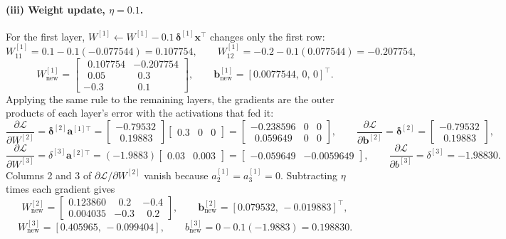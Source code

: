 \documentclass[11pt,a4paper]{article}
\begin{document}
\paragraph{(iii) Weight update, $\eta=0.1$.} For the first layer,
$W^{[1]}\leftarrow W^{[1]}-0.1\,\boldsymbol{\delta}^{[1]}\mathbf{x}^\top$ changes only the
first row:
\[
W^{[1]}_{11}=0.1-0.1(-0.077544)=0.107754,\qquad
W^{[1]}_{12}=-0.2-0.1(0.077544)=-0.207754,
\]
\[
W^{[1]}_{\text{new}}=\begin{bmatrix}
\ \ 0.107754&-0.207754\\ \ \ 0.05&\ \ 0.3\\ -0.3&\ \ 0.1\end{bmatrix},
\qquad
\mathbf{b}^{[1]}_{\text{new}}=[0.0077544,\,0,\,0]^\top .
\]
Applying the same rule to the remaining layers, the gradients are the outer products of each
layer's error with the activations that fed it:
\[
\frac{\partial\mathcal{L}}{\partial W^{[2]}}
=\boldsymbol{\delta}^{[2]}\mathbf{a}^{[1]\top}
=\begin{bmatrix}-0.79532\\ \ \ 0.19883\end{bmatrix}
 \begin{bmatrix}0.3&0&0\end{bmatrix}
=\begin{bmatrix}-0.238596&0&0\\ \ \ 0.059649&0&0\end{bmatrix},
\qquad
\frac{\partial\mathcal{L}}{\partial \mathbf{b}^{[2]}}
=\boldsymbol{\delta}^{[2]}=\begin{bmatrix}-0.79532\\ \ \ 0.19883\end{bmatrix},
\]
\[
\frac{\partial\mathcal{L}}{\partial W^{[3]}}
=\delta^{[3]}\mathbf{a}^{[2]\top}
=(-1.9883)\begin{bmatrix}0.03&0.003\end{bmatrix}
=\begin{bmatrix}-0.059649&-0.0059649\end{bmatrix},
\qquad
\frac{\partial\mathcal{L}}{\partial b^{[3]}}=\delta^{[3]}=-1.98830 .
\]
Columns 2 and 3 of $\partial\mathcal{L}/\partial W^{[2]}$ vanish because
$a^{[1]}_2=a^{[1]}_3=0$. Subtracting $\eta$ times each gradient gives
\[
W^{[2]}_{\text{new}}=\begin{bmatrix}0.123860&\ \ 0.2&-0.4\\0.004035&-0.3&\ \ 0.2\end{bmatrix},
\qquad
\mathbf{b}^{[2]}_{\text{new}}=[0.079532,\,-0.019883]^\top,
\]
\[
W^{[3]}_{\text{new}}=[0.405965,\,-0.099404],
\qquad
b^{[3]}_{\text{new}}=0-0.1(-1.9883)=0.198830 .
\]
\end{document}
